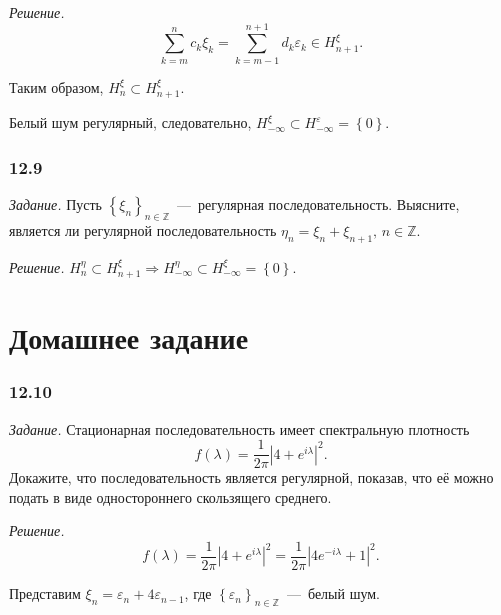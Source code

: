 \textit{Решение.}
\begin{equation*}
  \sum \limits_{k = m}^n c_k \xi_k =
  \sum \limits_{k = m - 1}^{n + 1} d_k \varepsilon_k \in
  H_{n + 1}^{ \xi }.
\end{equation*}

Таким образом, $H_n^{ \xi } \subset H_{n + 1}^{ \xi }$.

Белый шум регулярный, следовательно,
$H_{-\infty }^{ \xi } \subset
  H_{-\infty }^{ \varepsilon } =
  \left\{ 0 \right\} $.

\subsubsection*{12.9}

\textit{Задание.}
Пусть $ \left\{ \xi_n \right\}_{n \in \mathbb{Z}}$~---~регулярная последовательность.
Выясните,
является ли регулярной последовательность $ \eta_n = \xi_n + \xi_{n + 1}, \, n \in \mathbb{Z}$.

\textit{Решение.}
$H_n^{ \eta } \subset H_{n + 1}^{ \xi } \Rightarrow
  H_{-\infty }^{ \eta } \subset H_{-\infty }^{ \xi } = \left\{ 0 \right\} $.

\section*{Домашнее задание}

\subsubsection*{12.10}

\textit{Задание.}
Стационарная последовательность имеет спектральную плотность
\begin{equation*}
  f \left( \lambda \right) =
  \frac{1}{2 \pi } \left| 4 + e^{i \lambda } \right|^2.
\end{equation*}
Докажите, что последовательность является регулярной, показав,
что её можно подать в виде одностороннего скользящего среднего.

\textit{Решение.}
\begin{equation*}
  f \left( \lambda \right) =
  \frac{1}{2 \pi } \left| 4 + e^{i \lambda } \right|^2 =
  \frac{1}{2 \pi } \left| 4e^{-i \lambda } + 1 \right|^2.
\end{equation*}

Представим $ \xi_n = \varepsilon_n + 4 \varepsilon_{n - 1}$,
где $ \left\{ \varepsilon_n \right\}_{n \in \mathbb{Z}}$~---~белый шум.

